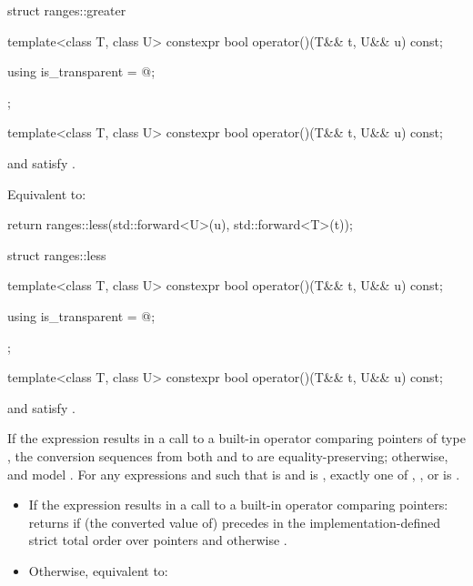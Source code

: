 %
\begin{codeblock}
struct ranges::greater {
  template<class T, class U>
    constexpr bool operator()(T&& t, U&& u) const;

  using is_transparent = @\unspecnc@;
};
\end{codeblock}

\begin{itemdecl}
template<class T, class U>
  constexpr bool operator()(T&& t, U&& u) const;
\end{itemdecl}

\begin{itemdescr}
\pnum
\constraints
{} and  satisfy .

\pnum
\effects
Equivalent to:
\begin{codeblock}
return ranges::less{}(std::forward<U>(u), std::forward<T>(t));
\end{codeblock}
\end{itemdescr}

%
\begin{codeblock}
struct ranges::less {
  template<class T, class U>
    constexpr bool operator()(T&& t, U&& u) const;

  using is_transparent = @\unspecnc@;
};
\end{codeblock}

\begin{itemdecl}
template<class T, class U>
  constexpr bool operator()(T&& t, U&& u) const;
\end{itemdecl}

\begin{itemdescr}
\pnum
\constraints
{} and  satisfy .

\pnum
\expects
If the expression  results in a
call to a built-in operator \tcode{<} comparing pointers of type , the
conversion sequences from both  and  to  are
equality-preserving;
otherwise,  and  model .
For any expressions
 and  such that  is  and
 is , exactly one of
,
, or
is .

\pnum
\effects
\begin{itemize}
\item
If the expression  results in a
call to a built-in operator \tcode{<} comparing pointers:
returns  if (the converted value of)  precedes  in
the implementation-defined strict total order over pointers
and otherwise .

\item
Otherwise, equivalent to:
\end{itemize}
\end{itemdescr}

